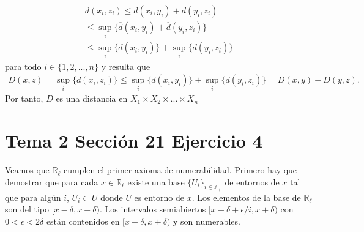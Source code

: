 \documentclass{article}
\begin{document}
\begin{eqnarray}
\overline{d}(x_i,z_i)\leq \overline{d}(x_i,y_i)+
\overline{d}(y_i,z_i)
\nonumber\\
\leq \sup_i\{\overline{d}(x_i,y_i)+
\overline{d}(y_i,z_i)\}\nonumber\\
\leq \sup_i\{\overline{d}(x_i,y_i)\}+
\sup_i\{\overline{d}(y_i,z_i)\}\nonumber
\end{eqnarray}
para todo $i\in\{1,2,...,n\}$  y resulta que
\begin{eqnarray}
D(x,z)=\sup_i\{\overline{d}(x_i,z_i)\}
\leq \sup_i\{\overline{d}(x_i,y_i)\}+
\sup_i\{\overline{d}(y_i,z_i)\}
=D(x,y)+D(y,z).\nonumber
\end{eqnarray}
Por tanto, $D$ es una distancia en $X_1\times X_2\times...\times X_n$
\section{Tema 2 Sección 21 Ejercicio 4}
Veamos que $\mathbb{R}_\ell$ cumplen el primer axioma de numerabilidad. Primero hay que demostrar que para cada $x \in \mathbb{R}_\ell$ existe una base $\{U_i\}_{i\in \mathbb{Z}_+}$ de entornos de $x$ tal que para algún $i$, $U_i\subset U$  donde $U$ es entorno de $x$. Los elementos de la base de $\mathbb{R}_\ell$ son del tipo $[x-\delta,x+\delta)$. Los intervalos semiabiertos $[x-\delta+\epsilon/i, x+\delta)$ con $0<\epsilon<2\delta$ están contenidos en $[x-\delta,x+\delta)$ y son numerables.
\end{document}
